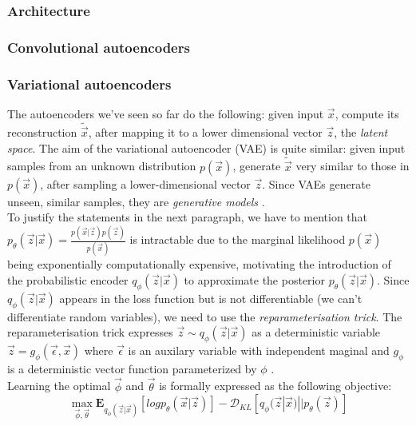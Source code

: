 \documentclass[12pt,twoside]{article}
\begin{document}
\subsubsection{Architecture}

\subsubsection{Convolutional autoencoders}

\subsubsection{Variational autoencoders}

The autoencoders we've seen so far do the following: given input $\vec{x}$, compute its reconstruction $\widetilde{\vec{x}}$, after mapping it to a lower dimensional vector $\vec{z}$, the \textit{latent space}. The aim of the variational autoencoder (VAE) is quite similar: given input samples from an unknown distribution $p(\vec{x})$, generate $\widetilde{\vec{x}}$ very similar to those in $p(\vec{x})$, after sampling a lower-dimensional vector $\vec{z}$. Since VAEs generate unseen, similar samples, they are \textit{generative models} \cite{Doersch2016}.\\

To justify the statements in the next paragraph, we have to mention that $p_{\theta}(\vec{z}|\vec{x})=\frac{p(\vec{x}|\vec{z})p(\vec{z})}{p(\vec{x})}$ is intractable due to the marginal likelihood $p(\vec{x})$ being exponentially computationally expensive, motivating the introduction of the probabilistic encoder $q_{\phi}(\vec{z}|\vec{x})$ to approximate the posterior $p_{\theta}(\vec{z}|\vec{x})$. Since $q_{\phi}(\vec{z}|\vec{x})$ appears in the loss function but is not differentiable (we can't differentiate random variables), we need to use the \textit{reparameterisation trick}. The reparameterisation trick expresses $\vec{z}\sim q_{\phi}(\vec{z}|\vec{x})$ as a deterministic variable $\vec{z}=g_{\phi}(\vec{\epsilon},\vec{x})$ where $\vec{\epsilon}$ is an auxilary variable with independent maginal and $g_{\phi}$ is a deterministic vector function parameterized by $\phi$ \cite{Kingma2014}.\\

Learning the optimal $\vec{\phi}$ and $\vec{\theta}$ is formally expressed as the following objective:
\begin{equation}
\label{vae_objective}
\max_{\vec{\phi},\vec{\theta}}\mathbf{E}_{q_{\phi}(\vec{z}|\vec{x})}[log p_{\theta}(\vec{x}|\vec{z})] - \mathcal{D}_{KL}[q_{\phi}(\vec{z}|\vec{x})||p_{\theta}(\vec{z})]
\end{equation}
\end{document}
